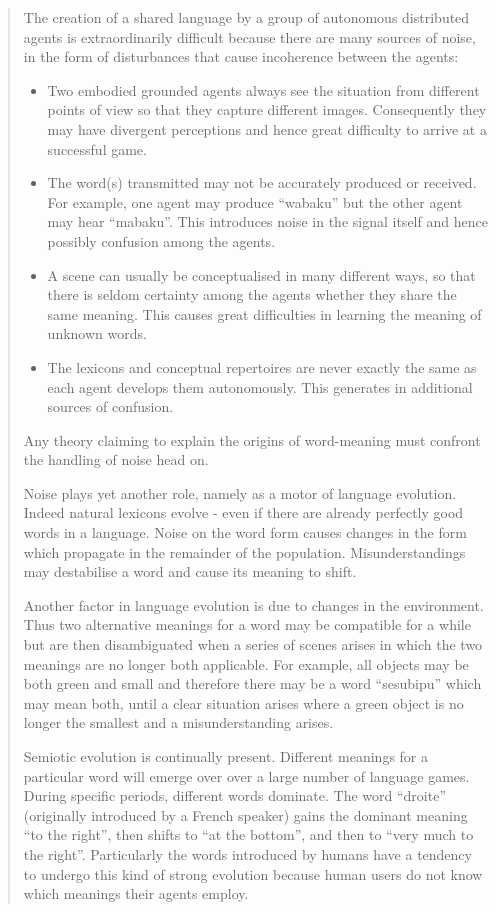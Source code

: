 \begin{quotation}
The creation of a shared language by a group of autonomous distributed agents is extraordinarily difficult because there are many sources of noise, in the form of disturbances that cause incoherence between the agents:

\begin{itemize} 
\item Two embodied grounded agents always see the situation from different points of view so that they capture different images. Consequently they may have divergent perceptions and hence great difficulty to arrive at a successful game. 
\item The word(s) transmitted may not be accurately produced or received. For example, one agent may produce ``wabaku'' but the other agent may hear ``mabaku''. This introduces noise in the signal itself and hence possibly confusion among the agents. 
\item A scene can usually be conceptualised in many different ways, so that there is seldom certainty among the agents whether they share the same meaning. This causes great difficulties in learning the meaning of unknown words. 
\item The lexicons and conceptual repertoires are never exactly the same as each agent develops them autonomously. This generates in additional sources of confusion.
\end{itemize} 

Any theory claiming to explain the origins of word-meaning must confront the handling of noise head on.

Noise plays yet another role, namely as a motor of language evolution. Indeed natural lexicons evolve - even if there are already perfectly good words in a language. Noise on the word form causes changes in the form which propagate in the remainder of the population. Misunderstandings may destabilise a word and cause its meaning to shift.

Another factor in language evolution is due to changes in the environment. Thus two alternative meanings for a word may be compatible for a while but are then disambiguated when a series of scenes arises in which the two meanings are no longer both applicable. For example, all objects may be both green and small and therefore there may be a word ``sesubipu'' which may mean both, until a clear situation arises where a green object is no longer the smallest and a misunderstanding arises.

Semiotic evolution is continually present. Different meanings for a particular word will emerge over over a large number of language games. During specific periods, different words dominate. The word ``droite'' (originally introduced by a French speaker) gains the dominant meaning ``to the right'', then shifts to ``at the bottom'', and then to ``very much to the right''. Particularly the words introduced by humans have a tendency to undergo this kind of strong evolution because human users do not know which meanings their agents employ.


\end{quotation}
